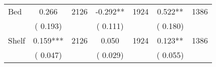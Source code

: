 \begin{tabular}{l*{6}{c}}
Bed        &              0.266      &       2126       &             -0.292**      &       1924       &              0.522**      &       1386       \\
                       &       (       0.193)            &                               &       (       0.111)            &                               &       (       0.180)            &                               \\
Shelf        &              0.159***      &       2126       &              0.050      &       1924       &              0.123**      &       1386       \\
                       &       (       0.047)            &                               &       (       0.029)            &                               &       (       0.055)            &                               \\
\hline \end{tabular}